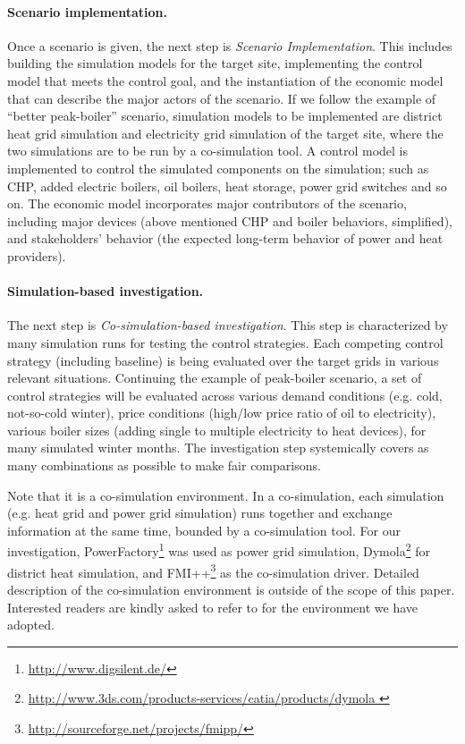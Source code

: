 \documentclass[review]{elsarticle}
\begin{document}
\paragraph{Scenario implementation.} 
\noindent
Once a scenario is given, the next step is {\em Scenario
  Implementation}. This includes building the simulation models 
for the target site, implementing the control model that meets the
control goal, and the instantiation of the economic model that can
describe the major actors of the scenario. 
If we follow the example of  ``better peak-boiler'' scenario,
simulation models to be implemented are district heat grid simulation
and electricity grid simulation of the target site, where the two
simulations are to be run by a co-simulation tool. A control model is
implemented to control the simulated components on the simulation;
such as CHP, added electric boilers, oil boilers, heat storage, power
grid switches and so on. The economic model incorporates major
contributors of the scenario, including major devices (above mentioned
CHP and boiler behaviors, simplified), and stakeholders' behavior (the
expected long-term behavior of power and heat providers). 

\paragraph{Simulation-based investigation.} 
\noindent
The next step is {\em Co-simulation-based investigation}. 
This step is characterized by many simulation runs for testing the
control strategies. 
Each competing control strategy (including baseline) is being
evaluated over the target grids in various relevant situations. 
Continuing the example of peak-boiler scenario, a set
of control strategies will be evaluated across various demand
conditions (e.g. cold, not-so-cold winter), price conditions (high/low
price ratio of oil to electricity), various boiler sizes (adding
single to multiple electricity to heat devices), for many simulated
winter months. The investigation step systemically covers as many 
combinations as possible to make fair comparisons.   

Note that it is a co-simulation environment. In a co-simulation, each
simulation (e.g. heat grid and power grid simulation) runs together
and exchange information at the same time, bounded by a co-simulation
tool. 
For our investigation,
PowerFactory\footnote{\url{http://www.digsilent.de/}} was used as
power grid simulation, Dymola\footnote{\url{http://www.3ds.com/products-services/catia/products/dymola
 }} for district heat simulation, and  FMI++\footnote{\url{http://sourceforge.net/projects/fmipp/}} as the 
co-simulation driver.  
Detailed description of the co-simulation environment is outside of
the scope of this paper. Interested readers are kindly asked to refer
to \cite{Widl_2015} for the environment we have adopted. 
\end{document}
